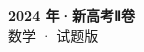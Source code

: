 \documentclass[zihao=-4, a4paper]{ctexart}
\begin{document}
\begin{center}
  {\Large\bfseries 2024 年·新高考Ⅱ卷}\\[4pt]
  {\large 数学 · 试题版}
\end{center}
\medskip
{}

\end{document}
